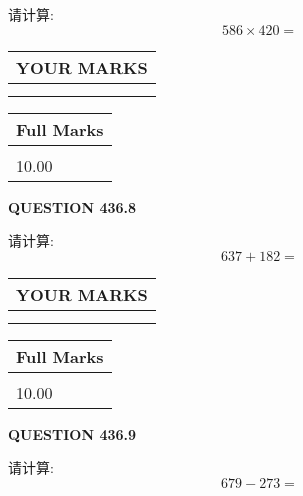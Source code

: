 \documentclass{ctexart}
\begin{document}
  
 
请计算:
\begin{equation}
586  \times    %
420 = \nonumber
\end{equation}
 

 

 
  
\vspace{0.2in}
  
\noindent\begin{tabular}{|l|}
\hline
 YOUR MARKS  \\
\hline
 \\ 
 \\ 
\hline
\end{tabular}
\hspace{0.05in} \begin{tabular}{|l|}
\hline
 Full Marks  \\
\hline
 \\ 
10.00 \\
\hline
\end{tabular}
{\textbf{\Large{QUESTION
436.8 
}}}
  
  
 
请计算:
\begin{equation}
637 +  %
182 = \nonumber
\end{equation}
 

 

 
  
\vspace{0.2in}
  
\noindent\begin{tabular}{|l|}
\hline
 YOUR MARKS  \\
\hline
 \\ 
 \\ 
\hline
\end{tabular}
\hspace{0.05in} \begin{tabular}{|l|}
\hline
 Full Marks  \\
\hline
 \\ 
10.00 \\
\hline
\end{tabular}
{\textbf{\Large{QUESTION
436.9 
}}}
  
  
 
请计算:
\begin{equation}
679 -   %
273 = \nonumber
\end{equation}
 

 

 
  
\vspace{0.2in}
  
\end{document}
